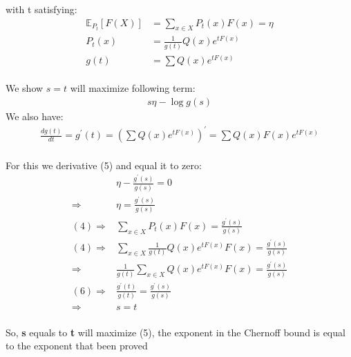 \documentclass[
  course = {{EE623 Information Theory}},
  quartile = {{Fall 2020}},
  assignment = 5,
  name = {{Mohammad Mahdi Rahimi}},
  studentnumber = {{20208244}},
  email = {{mahi@kaist.ac.kr}},
  firstexercise = 1
]{aga-homework}
\begin{document}
with t satisfying:
\begin{equation} \label{eq4}
\begin{split}
\mathbb{E}_{P_t} [F(X)] & = \sum_{x \in X} P_t(x)F(x) = \eta \\
P_t(x) & = \frac{1}{g(t)}Q(x)e^{tF(x)} \\
g(t) & = \sum{Q(x)e^{tF(x)}}
\end{split}
\end{equation}\\
We show $s = t$ will maximize following term:
\begin{equation} \label{eq5}
\begin{split}
s\eta - \log{g(s)}
\end{split}
\end{equation}
We also have:
\begin{equation} \label{eq6}
\begin{split}
\frac{dg(t)}{dt} = 
g^{\prime}(t) = (\sum{Q(x)e^{tF(x)}})^{\prime} = \sum{Q(x)F(x)e^{tF(x)}}
\end{split}
\end{equation}\\
For this we derivative (5) and equal it to zero:
\begin{equation} \label{eq7}
\begin{split}
& \eta - \frac{g^{\prime}(s)}{g(s)} = 0 \\
\Rightarrow & \eta = \frac{g^{\prime}(s)}{g(s)} \\
(4) \Rightarrow & \sum_{x \in X} P_t(x)F(x) = \frac{g^{\prime}(s)}{g(s)} \\
(4) \Rightarrow & \sum_{x \in X} \frac{1}{g(t)}Q(x)e^{tF(x)}F(x) = \frac{g^{\prime}(s)}{g(s)} \\
\Rightarrow & \frac{1}{g(t)}\sum_{x \in X} Q(x)e^{tF(x)}F(x) = \frac{g^{\prime}(s)}{g(s)} \\
(6) \Rightarrow & \frac{g^{\prime}(t)}{g(t)} = \frac{g^{\prime}(s)}{g(s)}\\
\Rightarrow & s = t
\end{split}
\end{equation}\\
So, \textbf{s} equals to \textbf{t} will maximize (5), the exponent in the Chernoff bound is equal to the exponent that been proved
\end{document}
